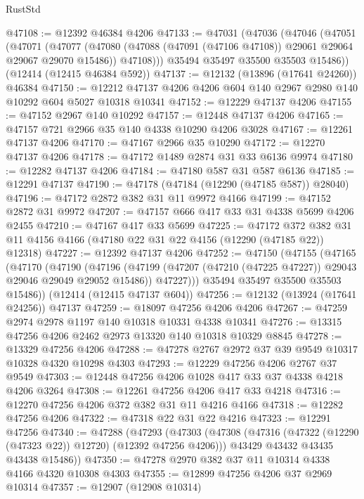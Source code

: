\begin{lexlean}{RustStd}
\begin{coremodule}
@47108 := @12392 @46384 @4206
@47133 := @47031
    (@47036
      (@47046
        (@47051
          (@47071
            (@47077
              (@47080 (@47088 (@47091 (@47106 @47108)) @29061 @29064 @29067 @29070 @15486))
              @47108)))
        @35494
        @35497
        @35500
        @35503
        @15486))
    (@12414 (@12415 @46384 @592))
@47137 := @12132 (@13896 (@17641 @24260)) @46384
@47150 := @12212 @47137 @4206 @4206 @604 @140 @2967 @2980 @140 @10292 @604 @5027 @10318 @10341
@47152 := @12229 @47137 @4206
@47155 := @47152 @2967 @140 @10292
@47157 := @12448 @47137 @4206
@47165 := @47157 @721 @2966 @35 @140 @4338 @10290 @4206 @3028
@47167 := @12261 @47137 @4206
@47170 := @47167 @2966 @35 @10290
@47172 := @12270 @47137 @4206
@47178 := @47172 @1489 @2874 @31 @33 @6136 @9974
@47180 := @12282 @47137 @4206
@47184 := @47180 @587 @31 @587 @6136
@47185 := @12291 @47137
@47190 := @47178 (@47184 (@12290 (@47185 @587)) @28040)
@47196 := @47172 @2872 @382 @31 @11 @9972 @4166
@47199 := @47152 @2872 @31 @9972
@47207 := @47157 @666 @417 @33 @31 @4338 @5699 @4206 @2455
@47210 := @47167 @417 @33 @5699
@47225 := @47172
    @372
    @382
    @31
    @11
    @4156
    @4166
    (@47180 @22 @31 @22 @4156 (@12290 (@47185 @22)) @12318)
@47227 := @12392 @47137 @4206
@47252 := @47150
    (@47155
      (@47165
        (@47170
          (@47190
            (@47196
              (@47199 (@47207 (@47210 (@47225 @47227)) @29043 @29046 @29049 @29052 @15486))
              @47227)))
        @35494
        @35497
        @35500
        @35503
        @15486))
    (@12414 (@12415 @47137 @604))
@47256 := @12132 (@13924 (@17641 @24256)) @47137
@47259 := @18097 @47256 @4206 @4206
@47267 := @47259 @2974 @2978 @1197 @140 @10318 @10331 @4338 @10341
@47276 := @13315 @47256 @4206 @2462 @2973 @13320 @140 @10318 @10329 @8845
@47278 := @13329 @47256 @4206
@47288 := @47278 @2767 @2972 @37 @39 @9549 @10317 @10328 @4320 @10298 @4303
@47293 := @12229 @47256 @4206 @2767 @37 @9549
@47303 := @12448 @47256 @4206 @1028 @417 @33 @37 @4338 @4218 @4206 @3264
@47308 := @12261 @47256 @4206 @417 @33 @4218
@47316 := @12270 @47256 @4206 @372 @382 @31 @11 @4216 @4166
@47318 := @12282 @47256 @4206
@47322 := @47318 @22 @31 @22 @4216
@47323 := @12291 @47256
@47340 := @47288
    (@47293
      (@47303
        (@47308 (@47316 (@47322 (@12290 (@47323 @22)) @12720) (@12392 @47256 @4206)))
        @43429
        @43432
        @43435
        @43438
        @15486))
@47350 := @47278 @2970 @382 @37 @11 @10314 @4338 @4166 @4320 @10308 @4303
@47355 := @12899 @47256 @4206 @37 @2969 @10314
@47357 := @12907 (@12908 @10314)

\end{coremodule}
\end{lexlean}
